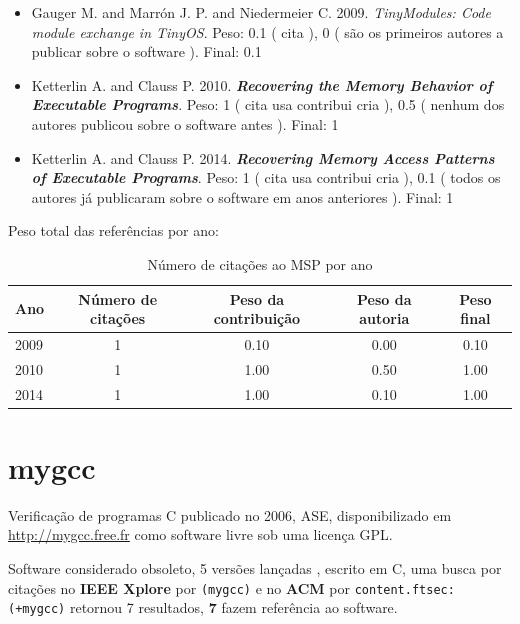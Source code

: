 \begin{itemize}
\item Gauger M. and Marrón J. P. and Niedermeier C.
      2009.
        \textit{ TinyModules: Code module exchange in TinyOS}.
      Peso:
      0.1 (
          cita
      ),
      0 (
são os primeiros autores a publicar sobre o software
      ).
      Final:
      0.1

\item Ketterlin A. and Clauss P.
      2010.
        \textbf{\textit{ Recovering the Memory Behavior of Executable Programs}}.
      Peso:
      1 (
          cita
          usa
          contribui
          cria
      ),
      0.5 (
nenhum dos autores publicou sobre o software antes
      ).
      Final:
      1

\item Ketterlin A. and Clauss P.
      2014.
        \textbf{\textit{ Recovering Memory Access Patterns of Executable Programs}}.
      Peso:
      1 (
          cita
          usa
          contribui
          cria
      ),
      0.1 (
todos os autores já publicaram sobre o software em anos anteriores
      ).
      Final:
      1

\end{itemize}

Peso total das referências por ano:

\begin{table}[h]
\caption{Número de citações ao MSP por ano}
\centering
\begin{tabular}{| l | c | c | c | c |}
  \hline
  Ano & Número de citações & Peso da contribuição & Peso da autoria & Peso final \\
  \hline
  2009
    & 1
    & 0.10
    & 0.00
    & 0.10 \\
  2010
    & 1
    & 1.00
    & 0.50
    & 1.00 \\
  2014
    & 1
    & 1.00
    & 0.10
    & 1.00 \\
  \hline
\end{tabular}
\end{table}


\section{mygcc}

Verificação de programas C
publicado no 2006, ASE,
disponibilizado em \url{http://mygcc.free.fr}
como software livre
sob uma licença GPL.

Software considerado obsoleto,
5 versões lançadas
,
escrito em C,
uma busca por citações no {\bf IEEE Xplore} por
\texttt{(mygcc)}
e no {\bf ACM} por
\texttt{content.ftsec:(+mygcc)}
retornou
7 resultados,
{\bf 7} fazem referência ao software.

